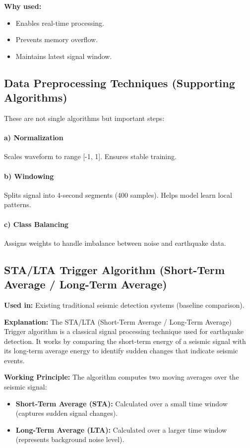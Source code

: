\documentclass[a4paper,12pt]{report}
\begin{document}
\textbf{Why used:}
\begin{itemize}
\item Enables real-time processing.
\item Prevents memory overflow.
\item Maintains latest signal window.
\end{itemize}

\subsection{Data Preprocessing Techniques (Supporting Algorithms)}
These are not single algorithms but important steps:

\paragraph{a) Normalization}
Scales waveform to range [-1, 1]. Ensures stable training.

\paragraph{b) Windowing}
Splits signal into 4-second segments (400 samples). Helps model learn local patterns.

\paragraph{c) Class Balancing}
Assigns weights to handle imbalance between noise and earthquake data.

\subsection{STA/LTA Trigger Algorithm (Short-Term Average / Long-Term Average)}
\label{ssec:stalta_baseline}

\textbf{Used in:} Existing traditional seismic detection systems (baseline comparison).

\textbf{Explanation:} The STA/LTA (Short-Term Average / Long-Term Average) Trigger algorithm is a classical signal processing technique used for earthquake detection. It works by comparing the short-term energy of a seismic signal with its long-term average energy to identify sudden changes that indicate seismic events.

\textbf{Working Principle:}
The algorithm computes two moving averages over the seismic signal:
\begin{itemize}
\item \textbf{Short-Term Average (STA):} Calculated over a small time window (captures sudden signal changes).
\item \textbf{Long-Term Average (LTA):} Calculated over a larger time window (represents background noise level).
\end{itemize}
\end{document}
